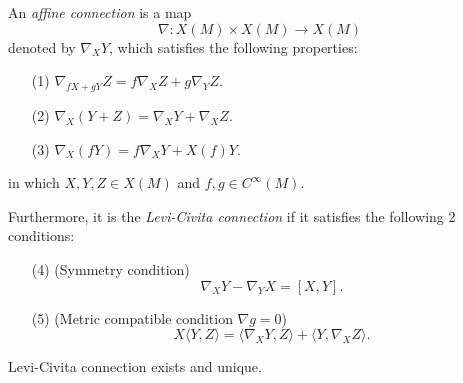 \begin{definition}
  An \textit{affine connection}  is a map 
  \[
    \nabla :X(M)\times X(M)\to X(M)
  \] 
  denoted by $\nabla _XY$, which satisfies the following properties:
  \begin{itemize}
    \item [(1)] $\nabla _{fX+gY}Z=f\nabla _{X}Z+g\nabla _{Y}Z.$
    \item [(2)] $\nabla _{X}(Y+Z)=\nabla _{X}Y+\nabla_X Z$.
    \item [(3)] $\nabla _X(fY)=f\nabla _XY+X(f)Y$.
  \end{itemize}
  in which $X,Y,Z\in X(M)$ and  $f,g\in C^\infty(M)$.
  
  Furthermore, it is the \textit{Levi-Civita connection} if it  satisfies the following 2 conditions:
 \begin{itemize}
   \item [(4)] (Symmetry condition) 
     \[
       \nabla _XY-\nabla _YX=[X,Y].
     \] 
   \item [(5)] (Metric compatible condition $\nabla g=0$)
     \[
       X\langle Y,Z\rangle=\langle \nabla _XY,Z\rangle+\langle Y,\nabla _XZ\rangle.
     \] 
 \end{itemize}
\end{definition}
\begin{theorem}
  Levi-Civita connection exists and unique.
\end{theorem}
